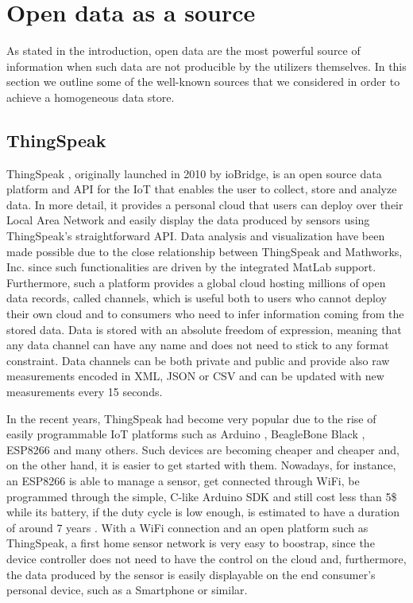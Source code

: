 \section{Open data as a source}

As stated in the introduction, open data are the most powerful source of information when such data are not producible by the utilizers themselves.
In this section we outline some of the well-known sources that we considered in order to achieve a homogeneous data store.

\subsection{ThingSpeak}
ThingSpeak \cite{thingspeak}, originally launched in 2010 by ioBridge, is an open source data platform and API for the IoT that enables the user to collect, store and analyze data.
In more detail, it provides a personal cloud that users can deploy over their Local Area Network and easily display the data produced by sensors using ThingSpeak's straightforward API.
Data analysis and visualization have been made possible due to the close relationship between ThingSpeak and Mathworks, Inc. since such functionalities are driven by the integrated MatLab support. 
Furthermore, such a platform provides a global cloud hosting millions of open data records, called channels, which is useful both to users who cannot deploy their own cloud and to consumers who need to infer information coming from the stored data.
Data is stored with an absolute freedom of expression, meaning that any data channel can have any name and does not need to stick to any format constraint.
Data channels can be both private and public and provide also raw measurements encoded in XML, JSON or CSV and can be updated with new measurements every 15 seconds.

In the recent years, ThingSpeak had become very popular due to the rise of easily programmable IoT platforms such as Arduino \cite{arduino}, BeagleBone Black \cite{bbblack}, ESP8266 \cite{esp8266} and many others.
Such devices are becoming cheaper and cheaper and, on the other hand, it is easier to get started with them.
Nowadays, for instance, an ESP8266 is able to manage a sensor, get connected through WiFi, be programmed through the simple, C-like Arduino SDK and still cost less than 5\$ while its battery, if the duty cycle is low enough, is estimated to have a duration of around 7 years \cite{di2015design}.
With a WiFi connection and an open platform such as ThingSpeak, a first home sensor network is very easy to boostrap, since the device controller does not need to have the control on the cloud and, furthermore, the data produced by the sensor is easily displayable on the end consumer's personal device, such as a Smartphone or similar.

